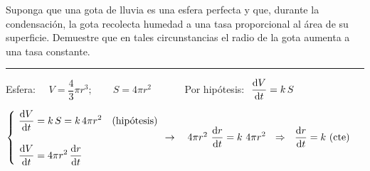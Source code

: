 \vspace{1cm}
\begin{miejercicio}
	
	Suponga que una gota de lluvia es una esfera perfecta y que, durante la condensación, la gota recolecta humedad a una tasa proporcional al área de su superficie. Demuestre que en tales circunstancias el radio de la gota aumenta a una tasa constante.
\color{teal!80}
\rule{200pt}{0.2pt}
\color{black}
\vspace{5mm}

Esfera: $\quad V=\dfrac 4 3 \pi r^3;\qquad S=4\pi r^2\qquad \quad$ Por hipótesis: $\ \displaystyle \dv{V}{t}=k\, S$

\vspace{3mm} $\begin{cases}
\ \displaystyle \dv{V}{t}=k\, S =k\, 4\pi r^2& \text{(hipótesis)} \\ \\
\ \displaystyle \dv{V}{t}=4\pi r^2\, \dv{r}{t} 	
\end{cases} \ \to \quad 4\pi r^2 \displaystyle \ \dv{r}{t}=k\ 4\pi r^2 \ \ \Rightarrow \ \ \displaystyle \dv{r}{t}=k\ \text{(cte)}$

\end{miejercicio}


